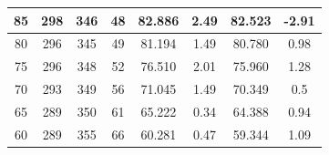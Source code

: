 \begin{landscape}
\begin{table}[]
\begin{tabular}{|c|c|c|c|c|c|c|c|}
85                                                                        & 298                                                           & 346                                                            & 48                                                             & 82.886                                                              & 2.49                  & 82.523           & -2.91                 \\ \hline
80                                                                        & 296                                                           & 345                                                            & 49                                                             & 81.194                                                              & 1.49                  & 80.780           & 0.98                  \\ \hline
75                                                                        & 296                                                           & 348                                                            & 52                                                             & 76.510                                                              & 2.01                  & 75.960           & 1.28                  \\ \hline
70                                                                        & 293                                                           & 349                                                            & 56                                                             & 71.045                                                              & 1.49                  & 70.349           & 0.5                   \\ \hline
65                                                                        & 289                                                           & 350                                                            & 61                                                             & 65.222                                                              & 0.34                  & 64.388           & 0.94                  \\ \hline
60                                                                        & 289                                                           & 355                                                            & 66                                                             & 60.281                                                              & 0.47                  & 59.344           & 1.09                  \\ \hline

\end{tabular}
\end{table}
\end{landscape}

